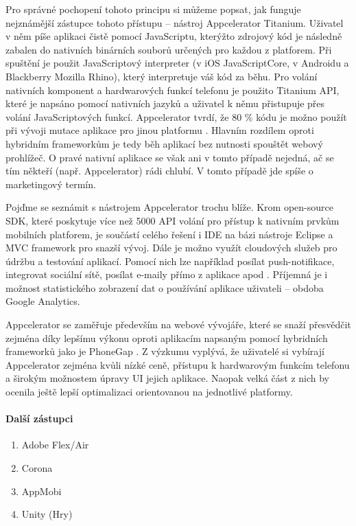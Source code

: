 Pro správné pochopení tohoto principu si můžeme popsat, jak funguje nejznámější zástupce tohoto přístupu – nástroj Appcelerator Titanium. Uživatel v něm píše aplikaci čistě pomocí JavaScriptu, kterýžto zdrojový kód je následně zabalen do nativních binárních souborů určených pro každou z platforem. Při spuštění je použit JavaScriptový interpreter (v iOS JavaScriptCore, v Androidu a Blackberry Mozilla Rhino), který interpretuje váš kód za běhu. Pro volání nativních komponent a hardwarových funkcí telefonu je použito Titanium API, které je napsáno pomocí nativních jazyků a uživatel k němu přistupuje přes volání JavaScriptových funkcí. Appcelerator tvrdí, že 80 \% kódu je možno použít při vývoji mutace aplikace pro jinou platformu \cite{building_apps_titanium}. Hlavním rozdílem oproti hybridním frameworkům je tedy běh aplikací bez nutnosti spouštět webový prohlížeč. O pravé nativní aplikace se však ani v tomto případě nejedná, ač se tím někteří (např. Appcelerator) rádi chlubí. V tomto případě jde spíše o marketingový termín.

Pojďme se seznámit s nástrojem Appcelerator trochu blíže. Krom open-source SDK, které poskytuje více než 5000 API volání pro přístup k nativním prvkům mobilních platforem, je součástí celého řešení i IDE na bázi nástroje Eclipse a MVC framework pro snazší vývoj. Dále je možno využít cloudových služeb pro údržbu a testování aplikací. Pomocí nich lze například posílat push-notifikace, integrovat sociální sítě, posílat e-maily přímo z aplikace apod \cite{appcelerator_features}. Příjemná je i možnost statistického zobrazení dat o používání aplikace uživateli – obdoba Google Analytics. 

Appcelerator se zaměřuje především na webové vývojáře, které se snaží přesvědčit zejména díky lepšímu výkonu oproti aplikacím napsaným pomocí hybridních frameworků jako je PhoneGap \cite{appcelerator_vs_phonegap}. Z výzkumu \cite{visionmobile_survey} vyplývá, že uživatelé si vybírají Appcelerator zejména kvůli nízké ceně, přístupu k hardwarovým funkcím telefonu a širokým možnostem úpravy UI jejich aplikace. Naopak velká část z nich by ocenila ještě lepší optimalizaci orientovanou na jednotlivé platformy.

\paragraph{Další zástupci}
\begin{enumerate}
	\item Adobe Flex/Air
	\item Corona
	\item AppMobi
	\item Unity (Hry)
\end{enumerate}


